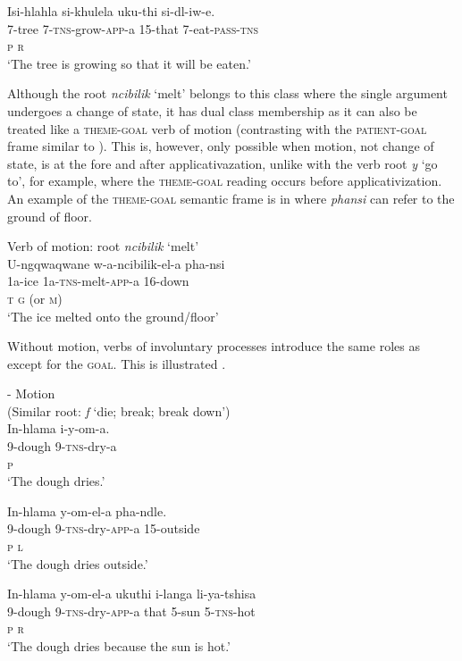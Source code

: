 \documentclass[output=paper]{langsci/langscibook}
\begin{document}
\ex
\gll Isi-hlahla si-khulela uku-thi si-dl-iw-e.\\
 7-tree 7-\textsc{tns}-grow-\textsc{app}-a 15-that 7-eat-\textsc{pass-tns}\\
 \textsc{p r}\\
\glt ‘The tree is growing so that it will be eaten.’ 
\z
\z

Although the root \textit{ncibilik} ‘melt’ belongs to this class where the single argument undergoes a change of state, it has dual class membership as it can also be treated like a \textsc{theme-goal} verb of motion (contrasting with the \textsc{patient-goal} frame similar to ). This is, however, only possible when motion, not change of state, is at the fore and after applicativazation, unlike with the verb root \textit{y }‘go to’, for example, where the \textsc{theme-goal} reading occurs before applicativization. An example of the \textsc{theme-goal} semantic frame is in  where \textit{phansi} can refer to the ground of floor. 

\ea
{Verb of motion: root \textit{ncibilik} ‘melt’}\\
\gll U-ngqwaqwane w-a-ncibilik-el-a pha-nsi\\
 1a-ice 1a-\textsc{tns}-melt-\textsc{app}-a 16-down \\
 \textsc{t g} (or \textsc{m})\\
\glt ‘The ice melted onto the ground/floor’
\z

 Without motion, verbs of involuntary processes introduce the same roles as  except for the \textsc{goal. }This is illustrated .

\ea
{- Motion }\\
 (Similar root: \textit{f} ‘die; break; break down’)\\
\ea
\gll In-hlama i-y-om-a. \\
 9-dough 9-\textsc{tns}-dry-a \\
 \textsc{p }\\
\glt ‘The dough dries.’


\ex
\gll In-hlama y-om-el-a pha-ndle. \\
 9-dough 9-\textsc{tns}-dry-\textsc{app}-a 15-outside \\
 \textsc{p l}\\
\glt ‘The dough dries outside.’

\ex
\gll In-hlama y-om-el-a ukuthi i-langa li-ya-tshisa \\
 9-dough 9-\textsc{tns}-dry-\textsc{app}-a that 5-sun 5-\textsc{tns}-hot\\
 \textsc{p r}\\
\glt ‘The dough dries because the sun is hot.’ 
\z
\z
\end{document}

